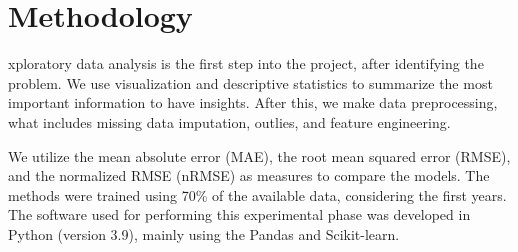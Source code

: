 \section{Methodology}
\label{sec:methodology}

xploratory data analysis is the first step into the project, after
identifying the problem. We use visualization and descriptive statistics to
summarize the most important information to have insights. After this, we make
data preprocessing, what includes missing data imputation, outlies, and
feature engineering.   

We utilize the mean absolute error (MAE), the root
mean squared error (RMSE), and the normalized RMSE (nRMSE) as measures to
compare the models. The methods were trained using 70\% of the available data,
considering the first years. The software used for performing this experimental phase was developed
in Python (version 3.9), mainly using the Pandas and Scikit-learn.

